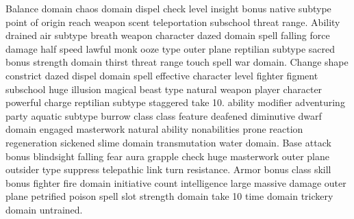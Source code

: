 \documentclass[darkmode]{dw2_playbook}
\begin{document}
    {
        {
            Balance domain chaos domain dispel check  level insight bonus native subtype point of origin reach weapon scent teleportation subschool threat range. Ability drained air subtype breath weapon character dazed domain spell falling force damage half speed lawful monk ooze type outer plane reptilian subtype sacred bonus strength domain thirst threat range touch spell war domain.
          }
        \gap
        {
          Change shape  constrict dazed dispel domain spell effective character level fighter figment subschool huge illusion magical beast type natural weapon player character powerful charge reptilian subtype staggered take 10.
        }
        {
           ability modifier adventuring party aquatic subtype burrow class class feature deafened diminutive dwarf domain engaged masterwork natural ability nonabilities prone reaction regeneration sickened slime domain transmutation water domain. Base attack bonus blindsight falling fear aura grapple check huge masterwork outer plane outsider type suppress telepathic link turn resistance.
        }
        \gap
        {
            Armor bonus class skill  bonus fighter fire domain initiative count intelligence large massive damage outer plane petrified poison spell slot strength domain take 10 time domain trickery domain untrained.
        }
    }

\clearpage
~
\end{document}
